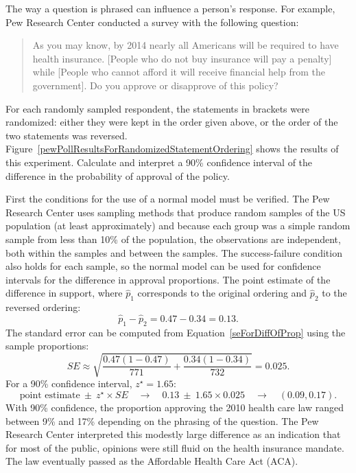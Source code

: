 \begin{examplewrap}
\begin{nexample}{The way a question is phrased can influence a person's response. For example, Pew Research Center conducted a survey with the following question:\footnotemark{}
\begin{quote}
As you may know, by 2014 nearly all Americans will be required to have health insurance. [People who do not buy insurance will pay a penalty] while [People who cannot afford it will receive financial help from the government]. Do you approve or disapprove of this policy?
\end{quote}
For each randomly sampled respondent, the statements in brackets were randomized: either they were kept in the order given above, or the order of the two statements was reversed. Figure~\ref{pewPollResultsForRandomizedStatementOrdering} shows the results of this experiment. Calculate and interpret a 90\% confidence interval of the difference in the probability of approval of the policy.}
First the conditions for the use of a normal model must be verified. The Pew Research Center uses sampling methods that produce random samples of the US population (at least approximately) and because each group was a simple random sample from less than 10\% of the population, the observations are independent, both within the samples and between the samples. The success-failure condition also holds for each sample, so the normal model can be used for confidence intervals for the difference in approval proportions.  The point estimate of the difference in support, where $\hat{p}_1$ corresponds to the original ordering and $\hat{p}_2$ to the reversed ordering:
$$\hat{p}_{1} - \hat{p}_{2} = 0.47 - 0.34 = 0.13.$$
The standard error can be computed from Equation~\eqref{seForDiffOfProp} using the sample proportions:
$$SE \approx \sqrt{\frac{0.47(1-0.47)}{771} + \frac{0.34(1-0.34)}{732}} = 0.025.$$
For a 90\% confidence interval, $z^{\star} = 1.65$:
$$\text{point estimate} \ \pm\ z^{\star} \times SE \quad \to \quad 0.13 \ \pm\ 1.65 \times  0.025 \quad \to \quad (0.09, 0.17).$$
With 90\% confidence, the proportion approving the 2010 health care law ranged between 9\% and 17\% depending on the phrasing of the question. The Pew Research Center interpreted this modestly large difference as an indication that for most of the public, opinions were still fluid on the health insurance mandate.  The law eventually passed as the Affordable Health Care Act (ACA).
\end{nexample}
\end{examplewrap}

